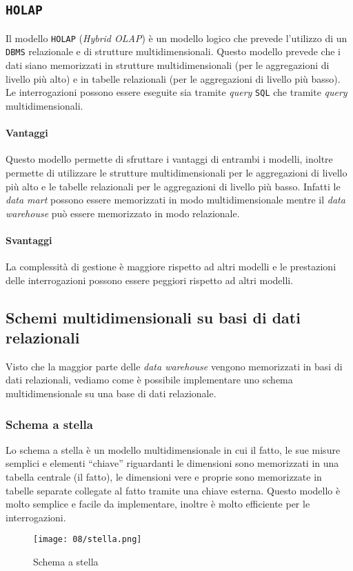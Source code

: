     \subsection{\texttt{HOLAP}} 
        Il modello \texttt{HOLAP} (\textit{Hybrid OLAP}) è un modello logico che prevede l'utilizzo di un \texttt{DBMS} relazionale e di strutture multidimensionali. Questo modello prevede che i dati siano memorizzati in strutture multidimensionali (per le aggregazioni di livello più alto) e in tabelle relazionali (per le aggregazioni di livello più basso). Le interrogazioni possono essere eseguite sia tramite \textit{query} \texttt{SQL} che tramite \textit{query} multidimensionali.
        \paragraph{Vantaggi} Questo modello permette di sfruttare i vantaggi di entrambi i modelli, inoltre permette di utilizzare le strutture multidimensionali per le aggregazioni di livello più alto e le tabelle relazionali per le aggregazioni di livello più basso. Infatti le \textit{data mart} possono essere memorizzati in modo multidimensionale mentre il \textit{data warehouse} può essere memorizzato in modo relazionale.
        \paragraph{Svantaggi} La complessità di gestione è maggiore rispetto ad altri modelli e le prestazioni delle interrogazioni possono essere peggiori rispetto ad altri modelli.
    \subsection{Schemi multidimensionali su basi di dati relazionali}
        Visto che la maggior parte delle \textit{data warehouse} vengono memorizzati in basi di dati relazionali, vediamo come è possibile implementare uno schema multidimensionale su una base di dati relazionale.
        \subsubsection{Schema a stella}
            Lo schema a stella è un modello multidimensionale in cui il fatto, le sue misure semplici e elementi ``chiave'' riguardanti le dimensioni sono memorizzati in una tabella centrale (il fatto), le dimensioni vere e proprie sono memorizzate in tabelle separate collegate al fatto tramite una chiave esterna. Questo modello è molto semplice e facile da implementare, inoltre è molto efficiente per le interrogazioni.
            \begin{figure}[H]
                \centering
                \texttt{[image: 08/stella.png]}
                \caption{Schema a stella}
            \end{figure}
